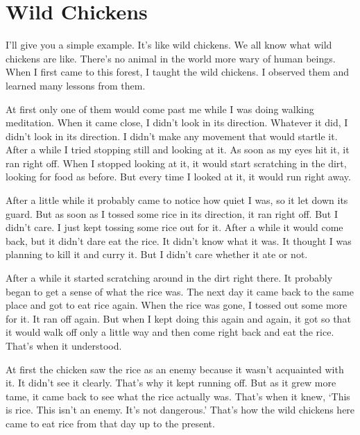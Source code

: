 
\clearpage

\section{Wild Chickens}

I'll give you a simple example. It's like wild chickens. We all know what wild chickens are like. There's no animal in the world more wary of human beings. When I first came to this forest, I taught the wild chickens. I observed them and learned many lessons from them.

At first only one of them would come past me while I was doing walking meditation. When it came close, I didn't look in its direction. Whatever it did, I didn't look in its direction. I didn't make any movement that would startle it. After a while I tried stopping still and looking at it. As soon as my eyes hit it, it ran right off. When I stopped looking at it, it would start scratching in the dirt, looking for food as before. But every time I looked at it, it would run right away.

After a little while it probably came to notice how quiet I was, so it let down its guard. But as soon as I tossed some rice in its direction, it ran right off. But I didn't care. I just kept tossing some rice out for it. After a while it would come back, but it didn't dare eat the rice. It didn't know what it was. It thought I was planning to kill it and curry it. But I didn't care whether it ate or not.

After a while it started scratching around in the dirt right there. It probably began to get a sense of what the rice was. The next day it came back to the same place and got to eat rice again. When the rice was gone, I tossed out some more for it. It ran off again. But when I kept doing this again and again, it got so that it would walk off only a little way and then come right back and eat the rice. That's when it understood.

At first the chicken saw the rice as an enemy because it wasn't acquainted with it. It didn't see it clearly. That's why it kept running off. But as it grew more tame, it came back to see what the rice actually was. That's when it knew, `This is rice. This isn't an enemy. It's not dangerous.' That's how the wild chickens here came to eat rice from that day up to the present.

